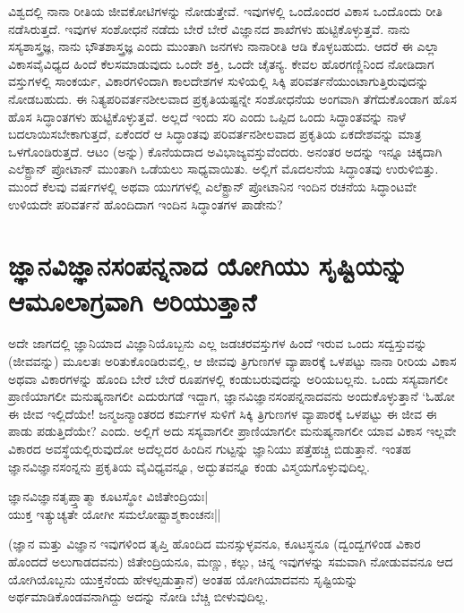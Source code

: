ವಿಶ್ವದಲ್ಲಿ ನಾನಾ ರೀತಿಯ ಜೀವಕೋಟಿಗಳನ್ನು ನೋಡುತ್ತೇವೆ. ಇವುಗಳಲ್ಲಿ ಒಂದೊಂದರ ವಿಕಾಸ ಒಂದೊಂದು ರೀತಿ ನಡೆಸಿರುತ್ತದೆ. ಇವುಗಳ ಸಂಶೋಧನೆ ನಡೆದು ಬೇರೆ ಬೇರೆ ವಿಜ್ಞಾನದ ಶಾಖೆಗಳು ಹುಟ್ಟಿಕೊಳ್ಳುತ್ತವೆ. ನಾನು ಸಸ್ಯಶಾಸ್ತ್ರಜ್ಞ, ನಾನು ಭೌತಶಾಸ್ತ್ರಜ್ಞ ಎಂದು ಮುಂತಾಗಿ ಜನಗಳು ನಾನಾರೀತಿ ಆಡಿ ಕೊಳ್ಳಬಹುದು. ಆದರೆ ಈ ಎಲ್ಲಾ ವಿಕಾಸವೈವಿಧ್ಯದ ಹಿಂದೆ ಕೆಲಸಮಾಡುವುದು ಒಂದೇ ಶಕ್ತಿ, ಒಂದೇ ಚೈತನ್ಯ. ಕೇವಲ ಹೊರಗಣ್ಣಿನಿಂದ ನೋಡಿದಾಗ ವಸ್ತುಗಳಲ್ಲಿ ಸಾಂಕರ್ಯ, ವಿಕಾರಗಳಿಂದಾಗಿ ಕಾಲದೇಶಗಳ ಸುಳಿಯಲ್ಲಿ ಸಿಕ್ಕಿ ಪರಿವರ್ತನೆಯುಂಟಾಗುತ್ತಿರುವುದನ್ನು ನೋಡಬಹುದು. ಈ ನಿತ್ಯಪರಿವರ್ತನಶೀಲವಾದ ಪ್ರಕೃತಿಯಷ್ಟನ್ನೇ ಸಂಶೋಧನೆಯ ಅಂಗವಾಗಿ ತೆಗೆದುಕೊಂಡಾಗ ಹೊಸ ಹೊಸ ಸಿದ್ಧಾಂತಗಳು ಹುಟ್ಟಿಕೊಳ್ಳುತ್ತವೆ. ಅಲ್ಲದೆ ಇಂದು ಸರಿ ಎಂದು ಒಪ್ಪಿದ ಒಂದು ಸಿದ್ಧಾಂತವನ್ನು ನಾಳೆ ಬದಲಾಯಿಸಬೇಕಾಗುತ್ತದೆ, ಏಕೆಂದರೆ ಆ ಸಿದ್ಧಾಂತವು ಪರಿವರ್ತನಶೀಲವಾದ ಪ್ರಕೃತಿಯ ಏಕದೇಶವನ್ನು ಮಾತ್ರ ಒಳಗೊಂಡಿರುತ್ತದೆ. ಆಟಂ (ಅನ್ನು) ಕೊನೆಯದಾದ ಅವಿಭಾಜ್ಯವಸ್ತುವೆಂದರು. ಅನಂತರ ಅದನ್ನು ಇನ್ನೂ ಚಿಕ್ಕದಾಗಿ ಎಲೆಕ್ಟ್ರಾನ್ ಪ್ರೋಟಾನ್ ಮುಂತಾಗಿ ಒಡೆಯಲು ಸಾಧ್ಯವಾಯಿತು. ಅಲ್ಲಿಗೆ ಮೊದಲನೆಯ ಸಿದ್ಧಾಂತವು ಉರುಳಿಬಿತ್ತು. ಮುಂದೆ ಕೆಲವು ವರ್ಷಗಳಲ್ಲಿ ಅಥವಾ ಯುಗಗಳಲ್ಲಿ ಎಲೆಕ್ಟ್ರಾನ್ ಪ್ರೋಟಾನಿನ ಇಂದಿನ ರಚನೆಯ ಸಿದ್ಧಾಂಟವೇ ಉಳಿಯದೇ ಪರಿವರ್ತನೆ ಹೊಂದಿದಾಗ ಇಂದಿನ ಸಿದ್ಧಾಂತಗಳ ಪಾಡೇನು?

\section*{ಜ್ಞಾನವಿಜ್ಞಾನಸಂಪನ್ನನಾದ ಯೋಗಿಯು ಸೃಷ್ಟಿಯನ್ನು ಆಮೂಲಾಗ್ರವಾಗಿ ಅರಿಯುತ್ತಾನೆ}

ಅದೇ ಜಾಗದಲ್ಲಿ ಜ್ಞಾನಿಯಾದ ವಿಜ್ಞಾನಿಯೊಬ್ಬನು ಎಲ್ಲ ಜಡಚರವಸ್ತುಗಳ ಹಿಂದೆ ಇರುವ ಒಂದು ಸದ್ವಸ್ತುವನ್ನು (ಜೀವವನ್ನು) ಮೂಲತಃ ಅರಿತುಕೊಂಡಿರುವಲ್ಲಿ, ಆ ಜೀವವು ತ್ರಿಗುಣಗಳ ವ್ಯಾಪಾರಕ್ಕೆ ಒಳಪಟ್ಟು ನಾನಾ ರೀರಿಯ ವಿಕಾಸ ಅಥವಾ ವಿಕಾರಗಳನ್ನು ಹೊಂದಿ ಬೇರೆ ಬೇರೆ ರೂಪಗಳಲ್ಲಿ ಕಂಡುಬರುವುದನ್ನು ಅರಿಯಬಲ್ಲನು. ಒಂದು ಸಸ್ಯವಾಗಲೀ ಪ್ರಾಣಿಯಾಗಲೀ ಮನುಷ್ಯನಾಗಲೀ ಎದುರುಗಡೆ ಇದ್ದಾಗ, ಜ್ಞಾನವಿಜ್ಞಾನಸಂಪನ್ನನಾದವನು ಅಂದುಕೊಳ್ಳುತ್ತಾನೆ `ಓಹೋ ಈ ಜೀವ ಇಲ್ಲಿದೆಯೇ! ಜನ್ಮಜನ್ಮಾಂತರದ ಕರ್ಮಗಳ ಸುಳಿಗೆ ಸಿಕ್ಕಿ  ತ್ರಿಗುಣಗಳ ವ್ಯಾಪಾರಕ್ಕೆ ಒಳಪಟ್ಟು ಈ ಜೀವ ಈ ಪಾಡು ಪಡುತ್ತಿದೆಯೇ? ಎಂದು. ಅಲ್ಲಿಗೆ ಅದು ಸಸ್ಯವಾಗಲೀ ಪ್ರಾಣಿಯಾಗಲೀ ಮನುಷ್ಯನಾಗಲೀ ಯಾವ ವಿಕಾಸ ಇಲ್ಲವೇ ವಿಕಾರದ ಅವಸ್ಥೆಯಲ್ಲಿರುವುದೋ ಅದೆಲ್ಲದರ ಹಿಂದಿನ ಗುಟ್ಟನ್ನು ಜ್ಞಾನಿಯು ಪತ್ತೆಹಚ್ಚಿ ಬಿಡುತ್ತಾನೆ. ಇಂತಹ ಜ್ಞಾನವಿಜ್ಞಾನಸಂನ್ನನು ಪ್ರಕೃತಿಯ ವೈವಿಧ್ಯವನ್ನೂ, ಅದ್ಭುತವನ್ನೂ ಕಂಡು ವಿಸ್ಮಯಗೊಳ್ಳುವುದಿಲ್ಲ.

\begin{shloka}
ಜ್ಞಾನವಿಜ್ಞಾನತೃಪ್ತ್ತಾತ್ಮಾ ಕೂಟಸ್ಥೋ ವಿಜಿತೇಂದ್ರಿಯಃ|\label{66}\\
ಯುಕ್ತ ಇತ್ಯುಚ್ಯತೇ ಯೋಗೀ ಸಮಲೋಷ್ಟಾಶ್ಮಕಾಂಚನಃ||
\end{shloka}

(ಜ್ಞಾನ ಮತ್ತು ವಿಜ್ಞಾನ ಇವುಗಳಿಂದ ತೃಪ್ತಿ ಹೊಂದಿದ ಮನಸ್ಸುಳ್ಳವನೂ, ಕೂಟಸ್ಥನೂ (ದ್ವಂದ್ವಗಳಿಂಡ ವಿಕಾರ ಹೊಂದದೆ ಅಲುಗಾಡದವನು) ಜಿತೇಂದ್ರಿಯನೂ, ಮಣ್ಣು, ಕಲ್ಲು, ಚಿನ್ನ ಇವುಗಳನ್ನು ಸಮವಾಗಿ ನೋಡುವವನೂ ಆದ ಯೋಗಿಯೊಬ್ಬನು ಯುಕ್ತನೆಂದು ಹೇಳಲ್ಪಡುತ್ತಾನೆ) ಅಂತಹ ಯೋಗಿಯಾದವನು ಸೃಷ್ಟಿಯನ್ನು ಅರ್ಥಮಾಡಿಕೊಂಡವನಾಗಿದ್ದು ಅದನ್ನು ನೋಡಿ ಬೆಚ್ಚಿ ಬೀಳುವುದಿಲ್ಲ.

